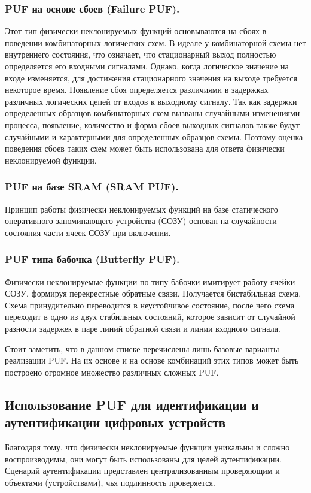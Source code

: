 \subsubsection{PUF на основе сбоев (Failure PUF). }
Этот тип физически неклонируемых функций основываются на сбоях в поведении комбинаторных логических схем. В идеале у комбинаторной схемы нет внутреннего состояния, что означает, что стационарный выход полностью определяется его входными сигналами. Однако, когда логическое значение на входе изменяется, для достижения стационарного значения на выходе требуется некоторое время. Появление сбоя определяется различиями в задержках различных логических цепей от входов к выходному сигналу. Так как задержки определенных образцов комбинаторных схем вызваны случайными изменениями процесса, появление, количество и форма сбоев выходных сигналов также будут случайными и характерными для определенных образцов схемы. Поэтому оценка поведения сбоев таких схем может быть использована для ответа физически неклонируемой функции.


\subsubsection{PUF на базе SRAM (SRAM PUF). }
\label{sub:domain:puf_types:sram}
Принцип работы физически неклонируемых функций на базе статического оперативного запоминающего устройства (СОЗУ) основан на случайности состояния части ячеек СОЗУ при включении.


\subsubsection{PUF типа бабочка (Butterfly PUF). }
\label{sub:domain:puf_types:arbiter}
Физически неклонируемые функции по типу бабочки имитирует работу ячейки СОЗУ, формируя перекрестные обратные связи. Получается бистабильная схема. Схема принудительно переводится в неустойчивое состояние, после чего схема переходит в одно из двух стабильных состояний, которое зависит от случайной разности задержек в паре линий обратной связи и линии входного сигнала.

Стоит заметить, что в данном списке перечислены лишь базовые варианты реализации PUF. На их основе и на основе комбинаций этих типов может быть построено огромное множество различных сложных PUF. ~\cite{cryptowiki_pufs, rmaes_pufs}


\subsection{Использование PUF для идентификации и аутентификации цифровых устройств}
\label{sub:domain:puf_auth}
Благодаря тому, что физически неклонируемые функции уникальны и сложно воспроизводимы, они могут быть использованы для целей аутентификации. Сценарий аутентификации представлен централизованным проверяющим и объектами (устройствами), чья подлинность проверяется.

